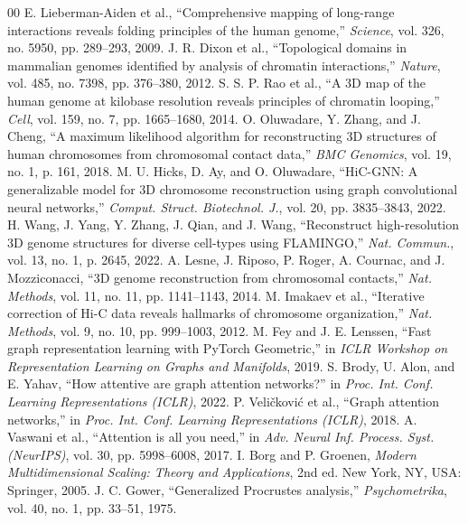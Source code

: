 \documentclass[conference]{IEEEtran}
\begin{document}
\begin{thebibliography}{00}
 E. Lieberman-Aiden et al., ``Comprehensive mapping of long-range interactions reveals folding principles of the human genome,'' \textit{Science}, vol. 326, no. 5950, pp. 289--293, 2009.
 J. R. Dixon et al., ``Topological domains in mammalian genomes identified by analysis of chromatin interactions,'' \textit{Nature}, vol. 485, no. 7398, pp. 376--380, 2012.
 S. S. P. Rao et al., ``A 3D map of the human genome at kilobase resolution reveals principles of chromatin looping,'' \textit{Cell}, vol. 159, no. 7, pp. 1665--1680, 2014.
 O. Oluwadare, Y. Zhang, and J. Cheng, ``A maximum likelihood algorithm for reconstructing 3D structures of human chromosomes from chromosomal contact data,'' \textit{BMC Genomics}, vol. 19, no. 1, p. 161, 2018.
 M. U. Hicks, D. Ay, and O. Oluwadare, ``HiC-GNN: A generalizable model for 3D chromosome reconstruction using graph convolutional neural networks,'' \textit{Comput. Struct. Biotechnol. J.}, vol. 20, pp. 3835--3843, 2022.
 H. Wang, J. Yang, Y. Zhang, J. Qian, and J. Wang, ``Reconstruct high-resolution 3D genome structures for diverse cell-types using FLAMINGO,'' \textit{Nat. Commun.}, vol. 13, no. 1, p. 2645, 2022.
 A. Lesne, J. Riposo, P. Roger, A. Cournac, and J. Mozziconacci, ``3D genome reconstruction from chromosomal contacts,'' \textit{Nat. Methods}, vol. 11, no. 11, pp. 1141--1143, 2014.
 M. Imakaev et al., ``Iterative correction of Hi-C data reveals hallmarks of chromosome organization,'' \textit{Nat. Methods}, vol. 9, no. 10, pp. 999--1003, 2012.
 M. Fey and J. E. Lenssen, ``Fast graph representation learning with PyTorch Geometric,'' in \textit{ICLR Workshop on Representation Learning on Graphs and Manifolds}, 2019.
 S. Brody, U. Alon, and E. Yahav, ``How attentive are graph attention networks?'' in \textit{Proc. Int. Conf. Learning Representations (ICLR)}, 2022.
 P. Veli\v{c}kovi\'{c} et al., ``Graph attention networks,'' in \textit{Proc. Int. Conf. Learning Representations (ICLR)}, 2018.
 A. Vaswani et al., ``Attention is all you need,'' in \textit{Adv. Neural Inf. Process. Syst. (NeurIPS)}, vol. 30, pp. 5998--6008, 2017.
 I. Borg and P. Groenen, \textit{Modern Multidimensional Scaling: Theory and Applications}, 2nd ed. New York, NY, USA: Springer, 2005.
 J. C. Gower, ``Generalized Procrustes analysis,'' \textit{Psychometrika}, vol. 40, no. 1, pp. 33--51, 1975.

\end{thebibliography}
\end{document}

